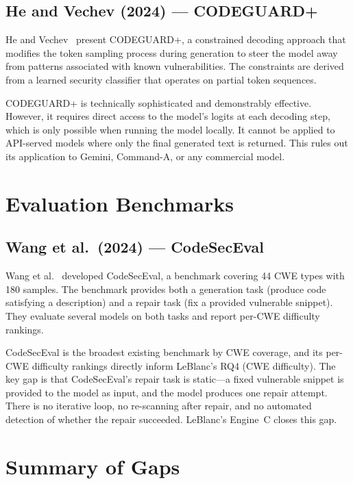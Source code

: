 \documentclass[12pt,a4paper]{report}
\begin{document}
\subsection{He and Vechev (2024) --- CODEGUARD+}
\label{ssec:codeguard}

He and Vechev~\cite{codeguard2024} present CODEGUARD+, a constrained decoding
approach that modifies the token sampling process during generation to steer the
model away from patterns associated with known vulnerabilities. The constraints
are derived from a learned security classifier that operates on partial token
sequences.

CODEGUARD+ is technically sophisticated and demonstrably effective. However, it
requires direct access to the model's logits at each decoding step, which is only
possible when running the model locally. It cannot be applied to API-served models
where only the final generated text is returned. This rules out its application
to Gemini, Command-A, or any commercial model.

\section{Evaluation Benchmarks}
\label{sec:litbenchmark}

\subsection{Wang et al.\ (2024) --- CodeSecEval}
\label{ssec:codeseceval}

Wang et al.~\cite{codeseceval2023} developed CodeSecEval, a benchmark covering
44 CWE types with 180 samples. The benchmark provides both a generation task
(produce code satisfying a description) and a repair task (fix a provided
vulnerable snippet). They evaluate several models on both tasks and report
per-CWE difficulty rankings.

CodeSecEval is the broadest existing benchmark by CWE coverage, and its per-CWE
difficulty rankings directly inform LeBlanc's RQ4 (CWE difficulty). The key gap
is that CodeSecEval's repair task is static---a fixed vulnerable snippet is
provided to the model as input, and the model produces one repair attempt. There
is no iterative loop, no re-scanning after repair, and no automated detection of
whether the repair succeeded. LeBlanc's Engine~C closes this gap.

\section{Summary of Gaps}
\label{sec:litgapsummary}
\end{document}
